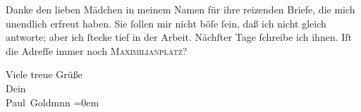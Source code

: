 \pstart
           Danke den lieben Mädchen in meinem Namen für ihre reizenden Briefe, die mich unendlich
               erfreut haben. Sie ſollen mir nicht böſe ſein, daß ich nicht gleich antworte; aber
               ich ſtecke tief in der Arbeit. Nächſter Tage ſchreibe ich ihnen. Iſt die Adreſſe
               immer noch \textsc{Maximilianplatz}?\pend
           
\pstart
           Viele treue Grüße {\\[\baselineskip]}Dein {\\[\baselineskip]}\spacefill\mbox{Paul Goldmnn}\pend
           \leftskip=0em{}
\pstart
